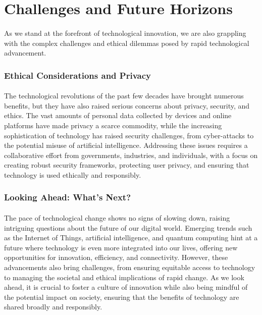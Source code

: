\documentclass{book}
\begin{document}
\section*{Challenges and Future Horizons}
\paragraph{}
As we stand at the forefront of technological innovation, we are also grappling with the complex challenges and ethical dilemmas posed by rapid technological advancement.

\subsubsection*{Ethical Considerations and Privacy}
\paragraph{}
The technological revolutions of the past few decades have brought numerous benefits, but they have also raised serious concerns about privacy, security, and ethics. The vast amounts of personal data collected by devices and online platforms have made privacy a scarce commodity, while the increasing sophistication of technology has raised security challenges, from cyber-attacks to the potential misuse of artificial intelligence. Addressing these issues requires a collaborative effort from governments, industries, and individuals, with a focus on creating robust security frameworks, protecting user privacy, and ensuring that technology is used ethically and responsibly.

\subsubsection*{Looking Ahead: What’s Next?}
\paragraph{}
The pace of technological change shows no signs of slowing down, raising intriguing questions about the future of our digital world. Emerging trends such as the Internet of Things, artificial intelligence, and quantum computing hint at a future where technology is even more integrated into our lives, offering new opportunities for innovation, efficiency, and connectivity. However, these advancements also bring challenges, from ensuring equitable access to technology to managing the societal and ethical implications of rapid change. As we look ahead, it is crucial to foster a culture of innovation while also being mindful of the potential impact on society, ensuring that the benefits of technology are shared broadly and responsibly.
\end{document}
